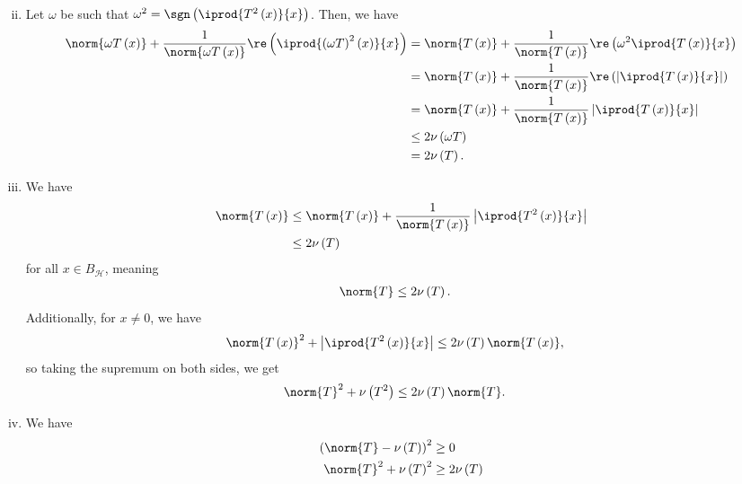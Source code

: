\documentclass[10pt]{mypackage}
\begin{document}
\begin{solution}
\begin{enumerate}[(i)]
\begin{align*}
      \end{align*}
    \item Let $\omega$ be such that $\omega^2 = \sgn\left( \iprod{T^2\left(x\right)}{x}\right)$. Then, we have
      \begin{align*}
        \norm{\omega T\left(x\right)} + \frac{1}{\norm{\omega T\left(x\right)}} \re\left( \iprod{\left(\omega T\right)^2\left(x\right)}{x}\right) &= \norm{T\left(x\right)} + \frac{1}{\norm{T\left(x\right)}}\re\left(\omega^2 \iprod{T\left(x\right)}{x}\right)\\
                        &= \norm{T\left(x\right)} + \frac{1}{\norm{T\left(x\right)}}\re\left( \left\vert \iprod{T\left(x\right)}{x} \right\vert\right)\\
                              &= \norm{T\left(x\right)} + \frac{1}{\norm{T\left(x\right)}} \left\vert \iprod{T\left(x\right)}{x} \right\vert\\
                              &\leq 2\nu\left(\omega T\right)\\
                              &= 2\nu\left(T\right).
      \end{align*}
    \item We have
      \begin{align*}
        \norm{T\left(x\right)} &\leq \norm{T\left(x\right)} + \frac{1}{\norm{T\left(x\right)}} \left\vert \iprod{T^2\left(x\right)}{x} \right\vert\\
                               &\leq 2\nu\left(T\right)
      \end{align*}
      for all $x\in B_{\mathcal{H}}$, meaning
      \begin{align*}
        \norm{T} &\leq 2\nu\left(T\right).
      \end{align*}
      Additionally, for $x\neq 0$, we have
      \begin{align*}
        \norm{T\left(x\right)}^2 + \left\vert \iprod{T^2\left(x\right)}{x} \right\vert &\leq 2\nu\left(T\right)\norm{T\left(x\right)},
      \end{align*}
      so taking the supremum on both sides, we get
      \begin{align*}
        \norm{T}^2 + \nu\left(T^2\right) &\leq 2\nu\left(T\right)\norm{T}.
      \end{align*}
    \item We have
      \begin{align*}
        \left(\norm{T} - \nu\left(T\right)\right)^2 &\geq 0\\
        \norm{T}^2 + \nu\left(T\right)^2 &\geq 2\nu\left(T\right)\\

\end{align*}
\end{enumerate}
\end{solution}
\end{document}
